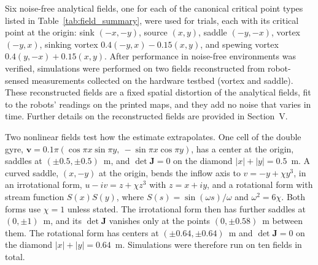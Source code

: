 \documentclass[lettersize,journal]{IEEEtran}
\begin{document}
Six noise-free analytical fields, one for each of the canonical critical point types listed in Table~\ref{tab:field_summary}, were used for trials, each with its critical point at the origin: sink $(-x,-y)$, source $(x,y)$, saddle $(-y,-x)$, vortex $(-y,x)$, sinking vortex $0.4(-y,x)-0.15(x,y)$, and spewing vortex $0.4(y,-x)+0.15(x,y)$. After performance in noise-free environments was verified, simulations were performed on two fields reconstructed from robot-sensed measurements collected on the hardware testbed (vortex and saddle). These reconstructed fields are a fixed spatial distortion of the analytical fields, fit to the robots' readings on the printed maps, and they add no noise that varies in time. Further details on the reconstructed fields are provided in Section~V.

Two nonlinear fields test how the estimate extrapolates. One cell of the double gyre, $\mathbf{v} = 0.1\pi(\cos\pi x \sin\pi y,\allowbreak\ -\sin\pi x \cos\pi y)$, has a center at the origin, saddles at $(\pm 0.5, \pm 0.5)$~m, and $\det\mathbf{J} = 0$ on the diamond $|x| + |y| = 0.5$~m. A curved saddle, $(x, -y)$ at the origin, bends the inflow axis to $v = -y + \chi y^3$, in an irrotational form, $u - iv = z + \chi z^3$ with $z = x + iy$, and a rotational form with stream function $S(x)S(y)$, where $S(s) = \sin(\omega s)/\omega$ and $\omega^2 = 6\chi$. Both forms use $\chi = 1$ unless stated. The irrotational form then has further saddles at $(0, \pm 1)$~m, and its $\det\mathbf{J}$ vanishes only at the points $(0, \pm 0.58)$~m between them. The rotational form has centers at $(\pm 0.64, \pm 0.64)$~m and $\det\mathbf{J} = 0$ on the diamond $|x| + |y| = 0.64$~m. Simulations were therefore run on ten fields in total.
\end{document}
